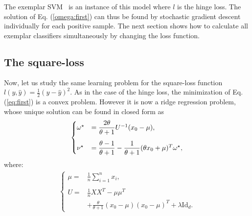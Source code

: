 The exemplar SVM~\cite{Efros11,Efros12} is an instance of this model where $l$ is the hinge loss. 
The solution of Eq. (\ref{omega:first}) can thus be found by stochastic gradient descent~\cite{bottou10} individually for each positive sample. The next section shows how to calculate all exemplar classifiers simultaneously by changing the loss function.

\subsection{The square-loss}\label{slem:intro}
Now, let us study the same learning problem for the square-loss function $l(y,\hat{y}) = \frac{1}{2}(y-\hat{y})^2$. As in the case of the hinge loss, the minimization of Eq. (\ref{eq:first}) is a convex problem. 
However it is now a ridge regression problem, whose unique solution can be found in closed form as
\begin{align}
\begin{cases}
\vspace{3 mm}
\omega^\star &= \dfrac{2\theta}{\theta+1}U^{-1}(x_0-\mu), \\
\nu^\star &= \dfrac{\theta-1}{\theta+1}-\dfrac{1}{\theta+1}(\theta x_0+\mu)^T\omega^\star,
\end{cases}
\label{omega:solution}
\end{align}
where:
\begin{align}
\begin{cases}
\mu = &\frac{1}{n}\sum_{i=1}^n x_i,\\ \\
U = &\frac{1}{n}XX^T-\mu\mu^T\\
&+\frac{\theta}{\theta+1}(x_0-\mu)(x_0-\mu)^T+\lambda\mathrm{Id}_d. \label{eq:U}
\end{cases}
\end{align}


